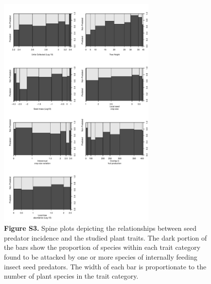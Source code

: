 \documentclass[11pt]{article}
\begin{document}
\begin{figure}[H]
\caption[]{\textbf{Figure S3.}  Spine plots depicting the relationships between seed predator incidence and the studied plant traits. The dark portion of the bars show the proportion of species within each trait category found to be attacked by one or more species of internally feeding insect seed predators. The width of each bar is proportionate to the number of plant species in the trait category.  }

\centering\includegraphics[width=0.7\textwidth]{../Figures/SpinePlotsa.pdf} 

\end{figure}
\newpage
\end{document}
